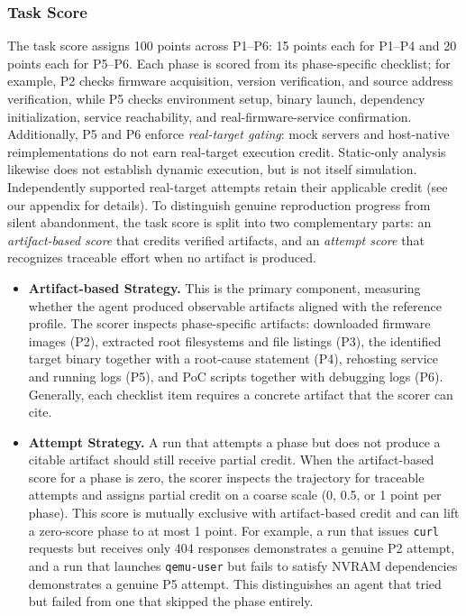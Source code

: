 \subsubsection{Task Score}
The task score assigns 100 points across P1--P6: 15 points each for P1--P4 and 20 points each for P5--P6. Each phase is scored from its phase-specific checklist; for example, P2 checks firmware acquisition, version verification, and source address verification, while P5 checks environment setup, binary launch, dependency initialization, service reachability, and real-firmware-service confirmation. Additionally, P5 and P6 enforce \emph{real-target gating}: mock servers and host-native reimplementations do not earn real-target execution credit. Static-only analysis likewise does not establish dynamic execution, but is not itself simulation. Independently supported real-target attempts retain their applicable credit (see our appendix for details). To distinguish genuine reproduction progress from silent abandonment, the task score is split into two complementary parts: an \emph{artifact-based score} that credits verified artifacts, and an \emph{attempt score} that recognizes traceable effort when no artifact is produced.

\begin{itemize}

\item \noindent\textbf{Artifact-based Strategy.} This is the primary component, measuring whether the agent produced observable artifacts aligned with the reference profile. The scorer inspects phase-specific artifacts: downloaded firmware images (P2), extracted root filesystems and file listings (P3), the identified target binary together with a root-cause statement (P4), rehosting service and running logs (P5), and PoC scripts together with debugging logs (P6). Generally, each checklist item requires a concrete artifact that the scorer can cite.

\item \noindent\textbf{Attempt Strategy.}
A run that attempts a phase but does not produce a citable artifact should still receive partial credit. When the artifact-based score for a phase is zero, the scorer inspects the trajectory for traceable attempts and assigns partial credit on a coarse scale (0, 0.5, or 1 point per phase). This score is mutually exclusive with artifact-based credit and can lift a zero-score phase to at most 1 point. For example, a run that issues \texttt{curl} requests
but receives only 404 responses demonstrates a genuine P2 attempt, and a run that launches \texttt{qemu-user} but fails to satisfy NVRAM dependencies demonstrates a genuine P5 attempt. This distinguishes an agent that tried but failed from one that skipped the phase entirely.

\end{itemize}

